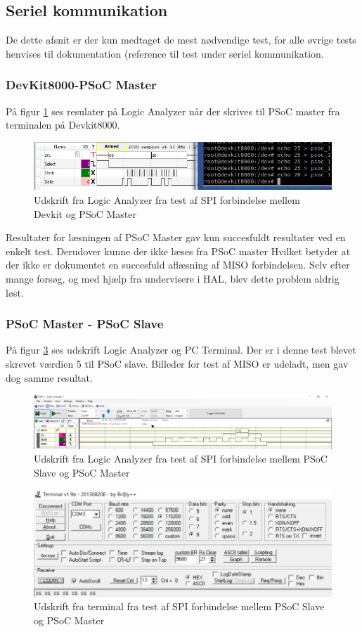 \subsection{Seriel kommunikation}
De dette afsnit er der kun medtaget de mest nødvendige test, for alle øvrige tests henvises til dokumentation (reference til test under seriel kommunikation. 

\subsubsection{DevKit8000-PSoC Master}
På figur \ref{LA_SPI_1} ses resulater på Logic Analyzer når der skrives til PSoC master fra terminalen på Devkit8000.

\begin{figure}[H]
	\includegraphics[scale=0.6]{tex/TeImRe/SPI/Analog_devkit_echo_psoc_1}
	\caption{Udskrift fra Logic Analyzer fra test af SPI forbindelse mellem Devkit og PSoC Master}
	\label{LA_SPI_1}
\end{figure}

Resultater for læsningen af PSoC Master gav kun succesfuldt resultater ved en enkelt test. Derudover kunne der ikke læses fra PSoC master
Hvilket betyder at der ikke er dokumentet en succesfuld aflæsning af MISO forbindelsen. Selv efter mange forsøg, og med hjælp fra undervisere i HAL, blev 
dette problem aldrig løst.

\subsubsection{PSoC Master - PSoC Slave}
På figur \ref{LA_SPI_3} ses udskrift Logic Analyzer og PC Terminal. Der er i denne test blevet skrevet værdien 5 til PSoC slave. Billeder for test af MISO er udeladt, men
gav dog samme resultat.

\begin{figure}[H]
	\includegraphics[scale=0.2]{tex/TeImRe/SPI/Logic_analyzer}
	\caption{Udskrift fra Logic Analyzer fra test af SPI forbindelse mellem PSoC Slave og PSoC Master}
	\label{LA_SPI_2}
\end{figure}

\begin{figure}[H]
	\includegraphics[scale=0.4]{tex/TeImRe/SPI/Terminal_spi_slave}
	\caption{Udskrift fra terminal fra test af SPI forbindelse mellem PSoC Slave og PSoC Master}
	\label{LA_SPI_3}
\end{figure}